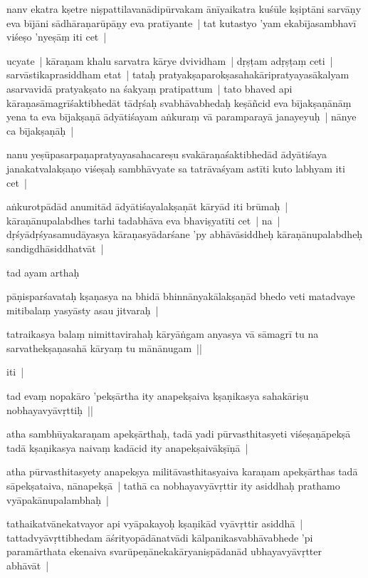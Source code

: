\documentclass[article,a4paper]{memoir}
\begin{document}
	  \pstart nanv ekatra kṣetre niṣpattilavanā\-dipū\-rvakam ā\-nī\-yaikatra kuśū\-le kṣiptā\-ni sarvā\-ṇy eva bī\-jā\-ni sā\-dhā\-raṇarū\-pā\-ṇy eva pratī\-yante | tat kutastyo 'yam ekabī\-jasambhavī\- viśeṣo 'nyeṣā\-ṃ iti cet | 
	\pend
      

	  \pstart ucyate | kā\-raṇam khalu sarvatra kā\-rye dvividham | dṛṣṭam adṛṣṭaṃ ceti | sarvā\-stikaprasiddham etat | tataḥ pratyakṣaparokṣasahakā\-ripratyayasā\-kalyam asarvavidā\- pratyakṣato na śakyaṃ pratipattum | tato bhaved api kā\-raṇasā\-magrī\-śaktibhedā\-t tā\-dṛśaḥ svabhā\-vabhedaḥ keṣā\-ñcid eva bī\-jakṣaṇā\-nā\-ṃ yena ta eva bī\-jakṣaṇā\- ā\-dyā\-tiśayam aṅkuraṃ vā\- paramparayā\- janayeyuḥ | nā\-nye ca bī\-jakṣaṇā\-ḥ |
	\pend
      

	  \pstart nanu yeṣū\-pasarpaṇapratyayasahacareṣu svakā\-raṇaśaktibhedā\-d ā\-dyā\-tiśaya janakatvalakṣaṇo viśeṣaḥ sambhā\-vyate sa tatrā\-vaśyam astī\-ti kuto labhyam iti cet | 
	\pend
      

	  \pstart aṅkurotpā\-dā\-d anumitā\-d ā\-dyā\-tiśayalakṣaṇā\-t kā\-ryā\-d iti brū\-maḥ | kā\-raṇā\-nupalabdhes tarhi tadabhā\-va eva bhaviṣyatī\-ti cet | na | dṛśyā\-dṛśyasamudā\-yasya kā\-raṇasyā\-darśane 'py abhā\-vā\-siddheḥ kā\-raṇā\-nupalabdheḥ sandigdhā\-siddhatvā\-t |
	\pend
      

	  \pstart tad ayam arthaḥ 
	\pend
      

	  \pstart pā\-ṇisparśavataḥ kṣaṇasya na bhidā\- bhinnā\-nyakā\-lakṣaṇā\-d bhedo veti matadvaye mitibalaṃ yasyā\-sty asau jitvaraḥ |
	\pend
      

	  \pstart tatraikasya balaṃ nimittavirahaḥ kā\-ryā\-ṅgam anyasya vā\- sā\-magrī\- tu na sarvathekṣaṇasahā\- kā\-ryaṃ tu mā\-nā\-nugam || 
	\pend
      

	  \pstart iti |
	\pend
      

	  \pstart tad evaṃ nopakā\-ro 'pekṣā\-rtha ity anapekṣaiva kṣaṇikasya sahakā\-riṣu nobhayavyā\-vṛttiḥ ||
	\pend
      

	  \pstart atha sambhū\-yakaraṇam apekṣā\-rthaḥ, tadā\- yadi pū\-rvasthitasyeti viśeṣaṇā\-pekṣā\- tadā\- kṣaṇikasya naivaṃ kadā\-cid ity anapekṣaivā\-kṣī\-ṇā\- |
	\pend
      

	  \pstart atha pū\-rvasthitasyety anapekṣya militā\-vasthitasyaiva karaṇam apekṣā\-rthas tadā\- sā\-pekṣataiva, nā\-napekṣā\- | tathā\- ca nobhayavyā\-vṛttir ity asiddhaḥ prathamo vyā\-pakā\-nupalambhaḥ | 
	\pend
      

	  \pstart tathaikatvā\-nekatvayor api vyā\-pakayoḥ kṣaṇikā\-d vyā\-vṛttir asiddhā\- | tattadvyā\-vṛttibhedam ā\-śrityopā\-dā\-natvā\-di kā\-lpanikasvabhā\-vabhede 'pi paramā\-rthata ekenaiva svarū\-peṇā\-nekakā\-ryaniṣpā\-danā\-d ubhayavyā\-vṛtter abhā\-vā\-t |
	\pend
      
\end{document}
